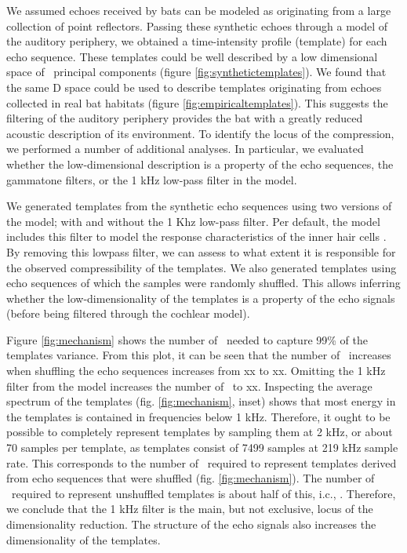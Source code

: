 \documentclass[preprint,5p]{elsarticle}
\begin{document}
We assumed echoes received by bats can be modeled as originating from a large collection of point reflectors. Passing these synthetic echoes through a model of the auditory periphery, we obtained a time-intensity profile (template) for each echo sequence. These templates could be well described by a low dimensional space of \pca\ principal components (figure \ref{fig:synthetictemplates}). We found that the same \pca D space could be used to describe templates originating from echoes collected in real bat habitats (figure \ref{fig:empiricaltemplates}). This suggests the filtering of the auditory periphery provides the bat with a greatly reduced acoustic description of its environment. To identify the locus of the compression, we performed a number of additional analyses. In particular, we evaluated whether the low-dimensional description is a property of the echo sequences, the gammatone filters, or the 1 kHz low-pass filter in the \citet{Wiegrebe2008} model.

We generated templates from the synthetic echo sequences using two versions of the \citet{Wiegrebe2008} model; with and without the 1 Khz low-pass filter. Per default, the model includes this filter to model the response characteristics of the inner hair cells \citep{Meddis2006,Reijniers2010a}. By removing this lowpass filter, we can assess to what extent it is responsible for the observed compressibility of the templates. We also generated templates using echo sequences of which the samples were randomly shuffled. This allows inferring whether the low-dimensionality of the templates is a property of the echo signals (before being filtered through the cochlear model). 

Figure \ref{fig:mechanism} shows the number of \pcs\ needed to capture 99\% of the templates variance. From this plot, it can be seen that the number of \pcs\ increases when shuffling the echo sequences increases from xx to xx. Omitting the 1 kHz filter from the  \citet{Wiegrebe2008} model increases the number of \pcs\ to xx.  Inspecting the average spectrum of the templates (fig. \ref{fig:mechanism}, inset) shows that most energy in the templates is contained in frequencies below 1 kHz. Therefore, it ought to be possible to completely represent templates by sampling them at 2 kHz,  or about 70 samples per template, as templates consist of 7499 samples at 219 kHz sample rate. This corresponds to the number of \pcs\ required to represent templates derived from echo sequences that were shuffled  (fig. \ref{fig:mechanism}). The number of \pcs\ required to represent unshuffled templates is about half of this, i.c., \pca. Therefore, we conclude that the 1 kHz filter is the main, but not exclusive, locus of the dimensionality reduction. The structure of the echo signals also increases the dimensionality of the templates.
\end{document}
